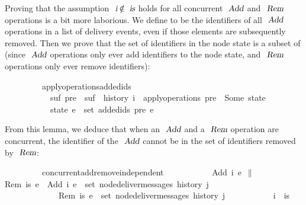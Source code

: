 Proving that the assumption $\isa{i} \mathbin{\isasymnotin} \isa{is}$ holds for all concurrent $\isa{Add}$ and $\isa{Rem}$ operations is a bit more laborious.
We define  to be the identifiers of all $\isa{Add}$ operations in a list of delivery events, even if those elements are subsequently removed.
Then we prove that the set of identifiers in the node state is a subset of  (since $\isa{Add}$ operations only ever add identifiers to the node state, and $\isa{Rem}$ operations only ever remove identifiers):
\vspace{0.275em}
\begin{isabellebody}
\ \ \ \ \ \ \ \ \ apply{\isacharunderscore}operations{\isacharunderscore}added{\isacharunderscore}ids{\isacharcolon}\isanewline
\ \ \ \ \ \ \ \ \ \ \ {\isachardoublequoteopen}{\isasymexists}suf{\isachardot}\ pre\ {\isacharat}\ suf\ {\isacharequal}\ history\ i{\isachardoublequoteclose}\ \ {\isachardoublequoteopen}apply{\isacharunderscore}operations\ pre\ {\isacharequal}\ Some\ state{\isachardoublequoteclose}\isanewline
\ \ \ \ \ \ \ \ \ \ \ {\isachardoublequoteopen}state\ e\ {\isasymsubseteq}\ set\ {\isacharparenleft}added{\isacharunderscore}ids\ pre\ e{\isacharparenright}{\isachardoublequoteclose}
\end{isabellebody}
\vspace{0.275em}
\noindent From this lemma, we deduce that when an $\isa{Add}$ and a $\isa{Rem}$ operation are concurrent, the identifier of the $\isa{Add}$ cannot be in the set of identifiers removed by $\isa{Rem}$:
\vspace{0.275em}
\begin{isabellebody}
\ \ \ \ \ \ \ \ \ concurrent{\isacharunderscore}add{\isacharunderscore}remove{\isacharunderscore}independent{\isacharcolon}\isanewline
\ \ \ \ \ \ \ \ \ \ \ {\isachardoublequoteopen}{\isacharparenleft}Add\ i\ e{}{\isacharparenright}\ $\|$ {\isacharparenleft}Rem\ is\ e{}{\isacharparenright}{\isachardoublequoteclose}\ \ {\isachardoublequoteopen}Add\ i\ e{}\ {\isasymin}\ set\ {\isacharparenleft}node{\isacharunderscore}deliver{\isacharunderscore}messages\ {\isacharparenleft}history\ j{\isacharparenright}{\isacharparenright}{\isachardoublequoteclose}\isanewline
\ \ \ \ \ \ \ \ \ \ \ \ \ {\isachardoublequoteopen}Rem\ is\ e{}\ {\isasymin}\ set\ {\isacharparenleft}node{\isacharunderscore}deliver{\isacharunderscore}messages\ {\isacharparenleft}history\ j{\isacharparenright}{\isacharparenright}{\isachardoublequoteclose}\isanewline
\ \ \ \ \ \ \ \ \ \ \ {\isachardoublequoteopen}i\ {\isasymnotin}\ is{\isachardoublequoteclose}
\end{isabellebody}
